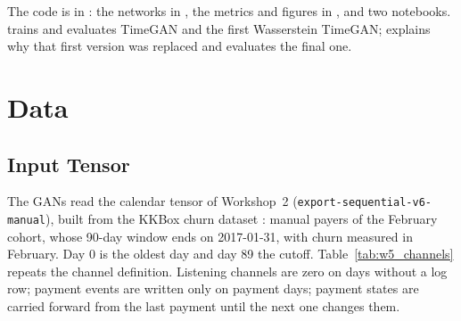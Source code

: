 \documentclass{article}
\begin{document}
The code is in : the networks in , the metrics and figures in , and two notebooks.  trains and evaluates TimeGAN and the first Wasserstein TimeGAN;  explains why that first version was replaced and evaluates the final one.

\section{Data}
\label{sec:w5_data}

\subsection{Input Tensor}

The GANs read the calendar tensor of Workshop~2 (\texttt{export-sequential-v6-manual}), built from the KKBox churn dataset \cite{kkbox2017}: manual payers of the February cohort, whose 90-day window ends on 2017-01-31, with churn measured in February. Day 0 is the oldest day and day 89 the cutoff. Table~\ref{tab:w5_channels} repeats the channel definition. Listening channels are zero on days without a log row; payment events are written only on payment days; payment states are carried forward from the last payment until the next one changes them.
\end{document}
